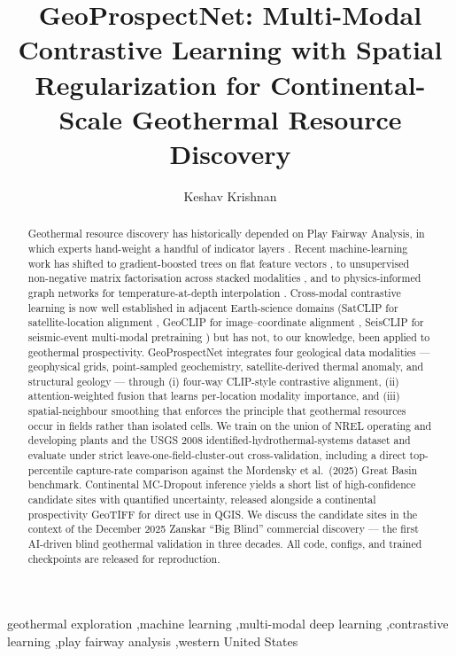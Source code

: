 \documentclass[review,12pt]{elsarticle}
\begin{document}
\begin{frontmatter}

\title{GeoProspectNet: Multi-Modal Contrastive Learning with Spatial Regularization for Continental-Scale Geothermal Resource Discovery}

\author{Keshav Krishnan}
\address{Independent Researcher, USA}

\begin{abstract}
Geothermal resource discovery has historically depended on Play Fairway Analysis, in which experts hand-weight a handful of indicator layers \citep{Faulds2020,Coolbaugh2005}. Recent machine-learning work has shifted to gradient-boosted trees on flat feature vectors \citep{Mordensky2025,Brown2023}, to unsupervised non-negative matrix factorisation across stacked modalities \citep{Vesselinov2022,Ahmmed2022}, and to physics-informed graph networks for temperature-at-depth interpolation \citep{Smith2024}. Cross-modal contrastive learning is now well established in adjacent Earth-science domains (SatCLIP for satellite-location alignment \citep{Klemmer2025}, GeoCLIP for image–coordinate alignment \citep{Vivanco2023}, SeisCLIP for seismic-event multi-modal pretraining \citep{Si2024}) but has not, to our knowledge, been applied to geothermal prospectivity. GeoProspectNet integrates four geological data modalities — geophysical grids, point-sampled geochemistry, satellite-derived thermal anomaly, and structural geology — through (i) four-way CLIP-style contrastive alignment, (ii) attention-weighted fusion that learns per-location modality importance, and (iii) spatial-neighbour smoothing that enforces the principle that geothermal resources occur in fields rather than isolated cells. We train on the union of NREL operating and developing plants and the USGS 2008 identified-hydrothermal-systems dataset and evaluate under strict leave-one-field-cluster-out cross-validation, including a direct top-percentile capture-rate comparison against the Mordensky et al.\ (2025) Great Basin benchmark. Continental MC-Dropout inference yields a short list of high-confidence candidate sites with quantified uncertainty, released alongside a continental prospectivity GeoTIFF for direct use in QGIS. We discuss the candidate sites in the context of the December 2025 Zanskar ``Big Blind'' commercial discovery \citep{ZanskarBigBlind2025} — the first AI-driven blind geothermal validation in three decades. All code, configs, and trained checkpoints are released for reproduction.
\end{abstract}

\begin{keyword}
geothermal exploration \sep machine learning \sep multi-modal deep learning \sep contrastive learning \sep play fairway analysis \sep western United States
\end{keyword}

\end{frontmatter}
\end{document}
